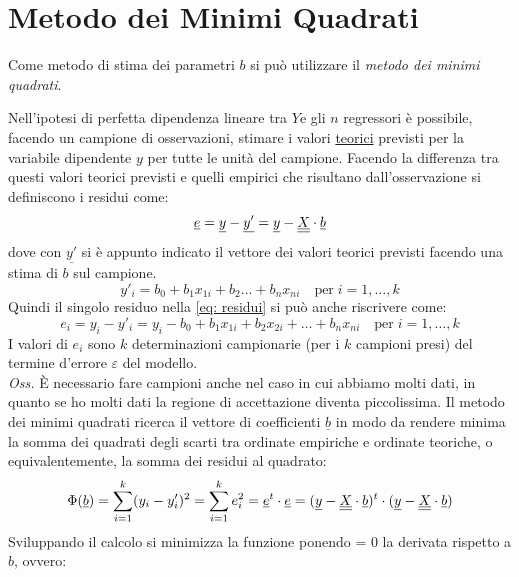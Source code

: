 \section{Metodo dei Minimi Quadrati}


Come metodo di stima dei parametri $b$ si può utilizzare il \textit{metodo dei minimi quadrati}.

Nell'ipotesi di perfetta dipendenza lineare tra $Y$e gli $n$ regressori è possibile, facendo un campione di osservazioni, stimare i valori \underline{teorici} previsti per la variabile dipendente $y$ per tutte le unità del campione. Facendo la differenza tra questi valori teorici previsti e quelli empirici che risultano dall'osservazione si definiscono i residui come:
\begin{equation}
\underline{e} = \underline{y} - \underline{y'} = \underline{y} - \underline{\underline{X}} \cdot \underline{b}
\label{eq: residui}
\end{equation}
dove con $\underline{y'}$ si è appunto indicato il vettore dei valori teorici previsti facendo una stima di $b$ sul campione.
\begin{equation}
y'_i = b_0 + b_1 x_{1i} + b_2 \dots + b_n x_{ni} \quad \text{per} \; i= 1, \dots, k
\end{equation}
Quindi il singolo residuo nella \eqref{eq: residui} si può anche riscrivere come:
\begin{equation}
e_i = y_i - y'_i = y_i - b_0 + b_1 x_{1i} + b_2 x_{2i} + \dots + b_n x_{ni} \quad \text{per} \; i= 1, \dots, k
\end{equation}
I valori di $e_i$ sono $k$ determinazioni campionarie (per i $k$ campioni presi) del termine d'errore $\varepsilon$ del modello.\\
\textit{Oss.} È necessario fare campioni anche nel caso in cui abbiamo
molti dati, in quanto se ho molti dati la regione di accettazione
diventa piccolissima.
Il metodo dei minimi quadrati ricerca il vettore di coefficienti $\underline{b}$ in modo da rendere minima la somma dei quadrati degli scarti tra ordinate empiriche e ordinate teoriche, o equivalentemente, la somma dei residui al quadrato:
\begin{equation}
\Phi(\underline{b}) = \sum_{i=1}^k (y_i - y'_i)^2 = \sum_{i=1}^k e_i^2 = \underline{e}^t 	\cdot \underline{e} = (\underline{y} - \underline{\underline{X}} \cdot \underline{b})^t \cdot (\underline{y} - \underline{\underline{X}} \cdot \underline{b})
\end{equation}
Sviluppando il calcolo si minimizza la funzione ponendo = 0 la derivata rispetto a $b$, ovvero:
